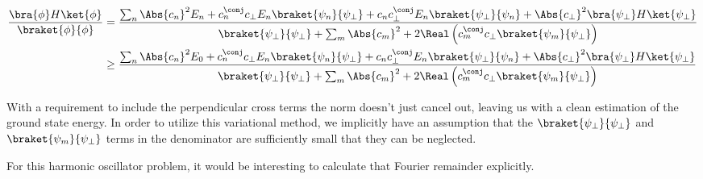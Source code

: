 \begin{equation}\label{eqn:variationHarmonicOscillator:290}
\begin{aligned}
\frac{\bra{\phi} H \ket{\phi}}{
\braket{\phi}{\phi}
}
&=
\frac{
\sum_n \Abs{c_n}^2 E_n
+ c_n^\conj c_\perp E_n
\braket{\psi_n}{\psi_\perp}
+ c_n c_\perp^\conj E_n \braket{\psi_\perp}{\psi_n}
+ \Abs{c_\perp}^2
\bra{\psi_\perp} H \ket{\psi_\perp} 
}
{
\braket{\psi_\perp}{\psi_\perp} +
\sum_m \Abs{c_m}^2 + 2 \Real \left(c_m^\conj c_\perp \braket{\psi_m}{\psi_\perp} \right)
} \\
&\ge 
\frac{
\sum_n \Abs{c_n}^2 E_0
+ c_n^\conj c_\perp E_n
\braket{\psi_n}{\psi_\perp}
+ c_n c_\perp^\conj E_n \braket{\psi_\perp}{\psi_n}
+ \Abs{c_\perp}^2
\bra{\psi_\perp} H \ket{\psi_\perp} 
}
{
\braket{\psi_\perp}{\psi_\perp} +
\sum_m \Abs{c_m}^2 + 2 \Real \left(c_m^\conj c_\perp \braket{\psi_m}{\psi_\perp} \right)
}
\end{aligned}
\end{equation}

With a requirement to include the perpendicular cross terms the norm doesn't just cancel out, leaving us with a clean estimation of the ground state energy.  In order to utilize this variational method, we implicitly have an assumption that the $\braket{\psi_\perp}{\psi_\perp}$ and $\braket{\psi_m}{\psi_\perp}$ terms in the denominator are sufficiently small that they can be neglected.

For this harmonic oscillator problem, it would be interesting to calculate that Fourier remainder explicitly.

\EndArticle
